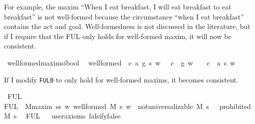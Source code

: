 \begin{isabellebody}
\begin{isamarkuptext}
For example, the maxim ``When I eat breakfast, I will eat breakfast to eat breakfast'' is not well-formed 
because the circumstance ``when I eat breakfast'' contains the act and goal. Well-formedness is not 
discussed in the literature, but if I require that the FUL only holds for well-formed maxim, it will now
be consistent.%
\end{isamarkuptext}\isamarkuptrue%
\isamarkupfalse%
\ well{\isacharunderscore}formed{\isacharcolon}{\isacharcolon}{\isachardoublequoteopen}maxim{\isasymRightarrow}s{\isasymRightarrow}i{\isasymRightarrow}bool{\isachardoublequoteclose}\ \ \isanewline
{\isachardoublequoteopen}well{\isacharunderscore}formed\ {\isasymequiv}\ {\isasymlambda}{\isacharparenleft}c{\isacharcomma}\ a{\isacharcomma}\ g{\isacharparenright}{\isachardot}\ {\isasymlambda}s{\isachardot}\ {\isasymlambda}w{\isachardot}\ {\isacharparenleft}{\isasymnot}\ \ {\isacharparenleft}c\ \isactrlbold {\isasymrightarrow}\ g{\isacharparenright}\ w{\isacharparenright}\ {\isasymand}\ {\isacharparenleft}{\isasymnot}\ \ {\isacharparenleft}c\ \isactrlbold {\isasymrightarrow}\ a\ s{\isacharparenright}\ w{\isacharparenright}{\isachardoublequoteclose}\isanewline
%
%
\begin{isamarkuptext}%
If I modify \texttt{FUL0} to only hold for well-formed maxims, it becomes consistent.%
\end{isamarkuptext}\isamarkuptrue%
\isamarkupfalse%
\ FUL\ \ \isanewline
{\isachardoublequoteopen}FUL\ {\isasymequiv}\ {\isasymforall}M{\isacharcolon}{\isacharcolon}maxim{\isachardot}\ {\isasymforall}s{\isacharcolon}{\isacharcolon}s{\isachardot}\ {\isacharparenleft}{\isasymforall}w{\isachardot}\ well{\isacharunderscore}formed\ M\ s\ w{\isacharparenright}\ {\isasymlongrightarrow}\ {\isacharparenleft}not{\isacharunderscore}universalizable\ M\ s\ {\isasymlongrightarrow}\ {\isasymTurnstile}\ {\isacharparenleft}prohibited\ M\ s{\isacharparenright}\ {\isacharparenright}{\isachardoublequoteclose}\isanewline
%
\isanewline
\isanewline
{}\isamarkupfalse%
\ {\isachardoublequoteopen}FUL{\isachardoublequoteclose}\isanewline
\ \ \isamarkupfalse%
{\isacharbrackleft}user{\isacharunderscore}axioms{\isacharcomma}\ falsify{\isacharequal}false{\isacharbrackright}%
\isadelimproof
\ %
\endisadelimproof
%
\isatagproof
{}\isamarkupfalse%
\isanewline
%
\end{isabellebody}

